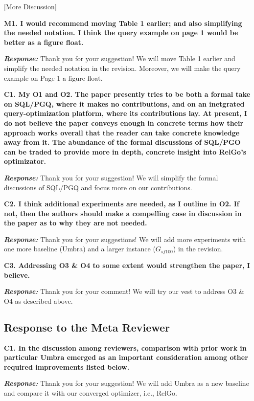 [More Discussion]


\textbf{M1. I would recommend moving Table 1 earlier; and also simplifying the needed notation. I think the query example on page 1 would be better as a figure float. }

\textbf{\textit{Response: }}
Thank you for your suggestion! We will move Table 1 earlier and simplify the needed notation in the revision. Moreover, we will make the query example on Page 1 a figure float.

\textbf{
C1. My O1 and O2. The paper presently tries to be both a formal take on SQL/PGQ, where it makes no contributions, and on an inetgrated query-optimization platform, where its contributions lay. At present, I do not believe the paper conveys enough in concrete terms how their approach works overall that the reader can take concrete knowledge away from it. The abundance of the formal discussions of SQL/PGO can be traded to provide more in depth, concrete insight into RelGo's optimizator.}

\textbf{\textit{Response: }}
Thank you for your suggestion! We will simplify the formal discussions of SQL/PGQ and focus more on our contributions.


\textbf{
C2. I think additional experiments are needed, as I outline in O2. If not, then the authors should make a compelling case in discussion in the paper as to why they are not needed.}

\textbf{\textit{Response: }}
Thank you for your suggestions! We will add more experiments with one more baseline (Umbra) and a larger instance ($G_{sf100}$) in the revision.


\textbf{
C3. Addressing O3 \& O4 to some extent would strengthen the paper, I believe.}

\textbf{\textit{Response: }}
Thank you for your comment! We will try our vest to address O3 \& O4 as described above. 

\subsection{Response to the Meta Reviewer}

\textbf{
C1. In the discussion among reviewers, comparison with prior work in particular Umbra emerged as an important consideration among other required improvements listed below.}

\textbf{\textit{Response: }}
Thank you for your suggestion! We will add Umbra as a new baseline and compare it with our converged optimizer, i.e., RelGo.


